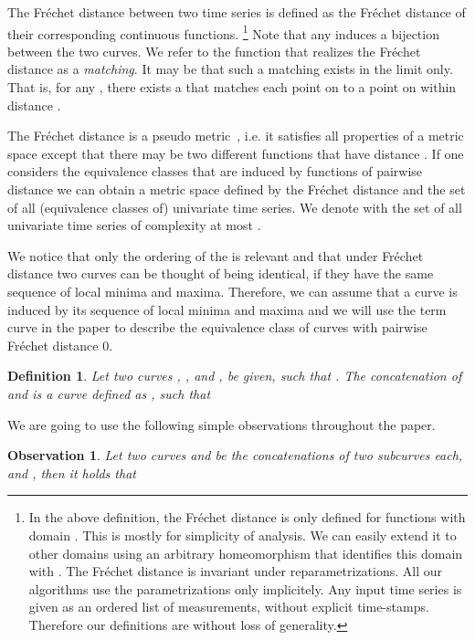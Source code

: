 \documentclass[11pt, letter]{article}
\newtheorem{definition}[theorem]{Definition}
\newtheorem{observation}[theorem]{Observation}
\newcommand{\deflab}[1]{\label{def:#1}}
\newcommand{\obslab}[1]{\label{obs:#1}}
\newcommand{\Frechet}{Fr\'echet\xspace}
\begin{document}
The \Frechet{} distance between two time series is defined as the \Frechet{} distance
of their corresponding 
continuous functions.
\footnote{
In the above definition, the \Frechet{} distance is only defined for functions with domain .
This is mostly for simplicity of analysis.
We can easily extend it to other domains using an arbitrary homeomorphism that identifies this domain with . 
The \Frechet{} distance is invariant under reparametrizations. 
All our algorithms use the parametrizations only implicitely. Any input time
series is given as an ordered list of measurements, without explicit
time-stamps. Therefore our definitions are without loss of generality.
}
Note that any  induces a bijection between the two curves.
We refer to the function  that realizes the \Frechet distance as a
\emph{matching}. It may be that such a matching exists in the limit only. That
is, for any , there exists a  that matches each point
on  to a point on  within distance .



The \Frechet{} distance is a pseudo metric~\cite{ag-cfdbt-95}, i.e. it satisfies all properties of
a metric space except that there may be two different functions that have distance
. If one considers the equivalence classes that are induced by functions of pairwise
distance  we can obtain a metric space  defined by the \Frechet
distance and the set  of all (equivalence classes of) univariate time series.
We denote with  the set of all univariate time series of complexity at
most .

We notice that only the ordering of the  is relevant and that under \Frechet distance two curves can be thought of being identical, if they have the same sequence of local minima and maxima. Therefore, we can assume that a curve is induced by its sequence of local minima and maxima and we will use the term curve in the paper to describe the equivalence class of curves with pairwise \Frechet distance 0.

\begin{definition}\deflab{concatenation}
Let two curves , , and ,  be given, such that . The concatenation of  and  is a curve  defined as , such that 


\end{definition}

We are going to use the following simple observations throughout the paper. 
\begin{observation}\obslab{fd:concat}
Let two curves  and 
be the concatenations of two subcurves each,  and
, then it holds  that 
\end{observation}
\end{document}

